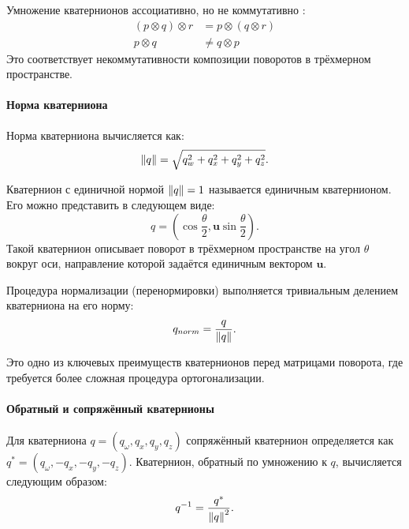 Умножение кватернионов ассоциативно, но не коммутативно \cite{hypercomplex_number}:
\begin{align*}
	(p \otimes q) \otimes r &= p \otimes (q \otimes r) 	\\
	p \otimes q &\neq q \otimes p
\end{align*}
Это соответствует некоммутативности композиции поворотов в трёхмерном пространстве.


\paragraph{Норма кватерниона}
Норма кватерниона вычисляется как:
\begin{equation*}
	\norm{q} = \sqrt{q_w^2 + q_x^2 + q_y^2 + q_z^2} \text{.}
\end{equation*}

Кватернион с единичной нормой $\norm{q} = 1$ называется единичным кватернионом. Его можно представить в следующем виде:
\begin{equation}
	\label{eq:geometry_interp_q}
	q = \left( \cos \frac{\theta}{2}, \bm{u} \sin \frac{\theta}{2} \right) \text{.}
\end{equation}
Такой кватернион описывает поворот в трёхмерном пространстве на угол $\theta$ вокруг оси, направление которой задаётся единичным вектором $\bm{u}$.

Процедура нормализации (перенормировки) выполняется тривиальным делением кватерниона на его норму:
\begin{equation}
	\label{eq:q_norm}
	q_{norm} = \frac{q}{\norm{q}} \text{.}
\end{equation}

Это одно из ключевых преимуществ кватернионов перед матрицами поворота, где требуется более сложная процедура ортогонализации.


\paragraph{Обратный и сопряжённый кватернионы}
Для кватерниона $q = (q_{\omega}, q_x, q_y, q_z)$ сопряжённый кватернион определяется как $q^* = (q_{\omega}, -q_x, -q_y, -q_z)$. Кватернион, обратный по умножению к $q$, вычисляется следующим образом:
\begin{equation*}
	q^{-1} = \frac{q^*}{\norm{q}^2} \text{.}
\end{equation*}



